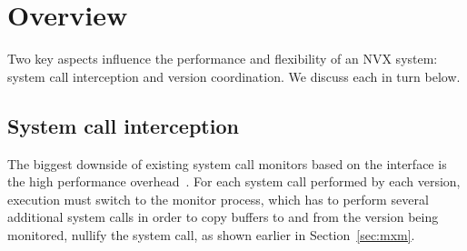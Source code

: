 \section{Overview}
\label{sec:overview}

Two key aspects influence the performance and flexibility of an NVX
system: system call interception and version coordination.  We discuss
each in turn below.

\subsection{System call interception}
\label{sec:interception}


The biggest downside of existing system call monitors based on the
\ptrace interface is the high performance
overhead~\cite{orchestra09,tachyon12}.  For each system call
performed by each version, execution must switch to the monitor
process, which has to perform several additional system calls in order
to copy buffers to and from the version being monitored, nullify the
system call, \etc as shown earlier in Section~\ref{sec:mxm}.

